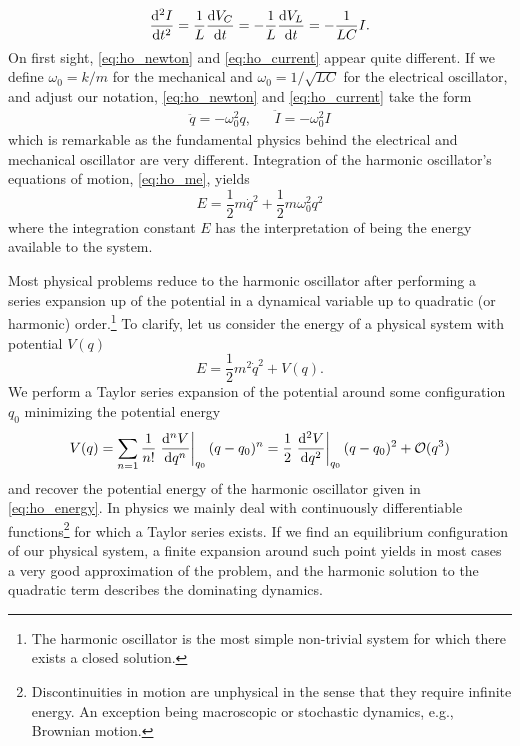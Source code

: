 \begin{equation}
    \dv[2]{I}{t}
    =
    \frac{1}{L}\dv{V_C}{t}
    =
    -\frac{1}{L}\dv{V_L}{t}
    =
    -\frac{1}{LC}I
    \label{eq:ho_current}.
\end{equation}
On first sight, \cref{eq:ho_newton} and \cref{eq:ho_current} appear quite different.
If we define $\omega_0=k/m$ for the mechanical and $\omega_0=1/\sqrt{LC}$ for the electrical oscillator, and adjust our notation, \cref{eq:ho_newton} and \cref{eq:ho_current} take the form
\begin{align}
    \ddot{q}
    =
    -\omega_0^2q
    ,&&
    \ddot{I}
    =
    -\omega_0^2I
    \label{eq:ho_me}
\end{align}
which is remarkable as the fundamental physics behind the electrical and mechanical oscillator are very different.
Integration of the harmonic oscillator's equations of motion, \cref{eq:ho_me}, yields
\begin{equation}
    E
    =
    \frac{1}{2}m\dot{q}^2
    +
    \frac{1}{2}m\omega_0^2q^2
    \label{eq:ho_energy}
\end{equation}
where the integration constant $E$ has the interpretation of being the energy available to the system.

Most physical problems reduce to the harmonic oscillator after performing a series expansion up of the potential in a dynamical variable up to quadratic (or harmonic) order.\footnote{The harmonic oscillator is the most simple non-trivial system for which there exists a closed solution.}
To clarify, let us consider the energy of a physical system with potential $V(q)$
\begin{equation}
    E
    =
    \frac{1}{2}m^2\dot{q}^2
    +
    V(q)
    \label{eq:pp_energy}.
\end{equation}
We perform a Taylor series expansion of the potential around some configuration $q_0$ minimizing the potential energy
\begin{equation}
    V(q)
    =
    \sum_{n=1}\frac{1}{n!}\eval{\dv[n]{V}{q}}_{q_0}(q-q_0)^n
    =
    \frac{1}{2}\eval{\dv[2]{V}{q}}_{q_0}(q-q_0)^2
    +
    \mathcal{O}(q^3)
    \label{eq:pp_potential}
\end{equation}
and recover the potential energy of the harmonic oscillator given in \cref{eq:ho_energy}.
In physics we mainly deal with continuously differentiable functions\footnote{Discontinuities in motion are unphysical in the sense that they require infinite energy. An exception being macroscopic or stochastic dynamics, e.g., Brownian motion.} for which a Taylor series exists.
If we find an equilibrium configuration of our physical system, a finite expansion around such point yields in most cases a very good approximation of the problem, and the harmonic solution to the quadratic term describes the dominating dynamics.

